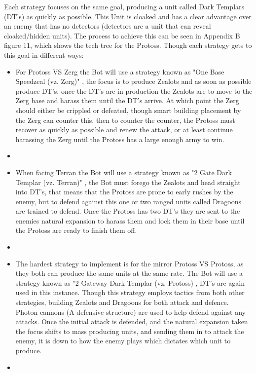 \documentclass[journal]{IEEEtran}
\begin{document}
	Each strategy focuses on the same goal, producing a unit called Dark Templars (DT's) as quickly as possible. This Unit is cloaked and has a clear advantage over an enemy that has no detectors (detectors are a unit that can reveal cloaked/hidden units). The process to achieve this can be seen in Appendix B figure 11, which shows the tech tree for the Protoss.
	Though each strategy gets to this goal in different ways:
	
	\begin{itemize}
		\item For Protoss VS Zerg the Bot will use a strategy known as "One Base Speedzeal (vz. Zerg)" \cite{PVZ}, the focus is to produce Zealots and as soon as possible produce DT's, once the DT's are in production the Zealots are to move to the Zerg base and harass them until the DT's arrive. At which point the Zerg should either be crippled or defeated, though smart building placement by the Zerg can counter this, then to counter the counter, the Protoss must recover as quickly as possible and renew the attack, or at least continue harassing the Zerg until the Protoss has a large enough army to win.
		\item[]
		\item When facing Terran the Bot will use a strategy known as "2 Gate Dark Templar (vz. Terran)" \cite{PVT}, the Bot must forego the Zealots and head straight into DT's, that means that the Protoss are prone to early rushes by the enemy, but to defend against this one or two ranged units called Dragoons are trained to defend. Once the Protoss has two DT's they are sent to the enemies natural expansion to harass them and lock them in their base until the Protoss are ready to finish them off.
		\item[]
		\item The hardest strategy to implement is for the mirror Protoss VS Protoss, as they both can produce the same units at the same rate. The Bot will use a strategy known as "2 Gateway Dark Templar (vz. Protoss) \cite{PVP}, DT's are again used in this instance. Though this strategy employs tactics from both other strategies, building Zealots and Dragoons for both attack and defence. Photon cannons (A defensive structure) are used to help defend against any attacks. Once the initial attack is defended, and the natural expansion taken the focus shifts to mass producing units, and sending them in to attack the enemy, it is down to how the enemy plays which dictates which unit to produce.
		\item[]
	\end{itemize}
	
\end{document}
